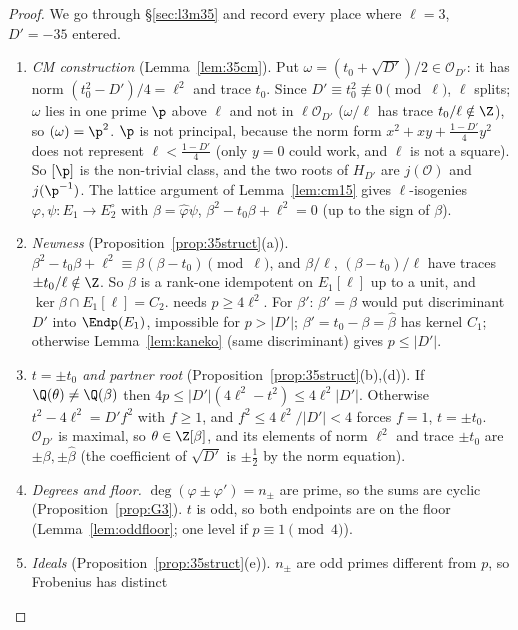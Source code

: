 \begin{proof}
We go through \S\ref{sec:l3m35} and record every place where $\ell=3$, $D'=-35$ entered.
\begin{enumerate}[label=(\roman*)]
\item \emph{CM construction} (Lemma~\ref{lem:35cm}).  Put $\omega=(t_0+\sqrt{D'})/2\in\mathcal O_{D'}$: it has norm
  $(t_0^2-D')/4=\ell^2$ and trace $t_0$.  Since $D'\equiv t_0^2\not\equiv0\pmod\ell$, $\ell$ splits; $\omega$ lies in one
  prime $\p$ above $\ell$ and not in $\ell\mathcal O_{D'}$ ($\omega/\ell$ has trace $t_0/\ell\notin\Z$), so $(\omega)=\p^2$.  $\p$ is
  not principal, because the norm form $x^2+xy+\frac{1-D'}4y^2$ does not represent $\ell<\frac{1-D'}4$ (only $y=0$ could
  work, and $\ell$ is not a square).  So $[\p]$ is the non-trivial class, and the two roots of $H_{D'}$ are $j(\mathcal O)$
  and $j(\p^{-1})$.  The lattice argument of Lemma~\ref{lem:cm15} gives $\ell$-isogenies $\varphi,\psi:E_1\to E_2^\circ$ with
  $\beta=\widehat\varphi\psi$, $\beta^2-t_0\beta+\ell^2=0$ (up to the sign of $\beta$).
\item \emph{Newness} (Proposition~\ref{prop:35struct}(a)).  $\beta^2-t_0\beta+\ell^2\equiv\beta(\beta-t_0)\pmod\ell$, and
  $\beta/\ell$, $(\beta-t_0)/\ell$ have traces $\pm t_0/\ell\notin\Z$.  So $\beta$ is a rank-one idempotent on $E_1[\ell]$ up to
  a unit, and $\ker\beta\cap E_1[\ell]=C_2$.  \cite[Prop.~23]{BS} needs $p\ge4\ell^2$.  For $\beta'$: $\beta'=\beta$ would put
  discriminant $D'$ into $\Endp(E_1)$, impossible for $p>|D'|$; $\beta'=t_0-\beta=\widehat\beta$ has kernel $C_1$; otherwise
  Lemma~\ref{lem:kaneko} (same discriminant) gives $p\le|D'|$.
\item \emph{$t=\pm t_0$ and partner root} (Proposition~\ref{prop:35struct}(b),(d)).  If $\Q(\theta)\neq\Q(\beta)$ then
  $4p\le|D'|(4\ell^2-t^2)\le4\ell^2|D'|$.  Otherwise $t^2-4\ell^2=D'f^2$ with $f\ge1$, and $f^2\le4\ell^2/|D'|<4$ forces $f=1$,
  $t=\pm t_0$.  $\mathcal O_{D'}$ is maximal, so $\theta\in\Z[\beta]$, and its elements of norm $\ell^2$ and trace $\pm t_0$ are
  $\pm\beta,\pm\widehat\beta$ (the coefficient of $\sqrt{D'}$ is $\pm\frac12$ by the norm equation).
\item \emph{Degrees and floor.}  $\deg(\varphi\pm\varphi')=n_\pm$ are prime, so the sums are cyclic
  (Proposition~\ref{prop:G3}).  $t$ is odd, so both endpoints are on the floor (Lemma~\ref{lem:oddfloor}; one level if
  $p\equiv1\pmod4$).
\item \emph{Ideals} (Proposition~\ref{prop:35struct}(e)).  $n_\pm$ are odd primes different from $p$, so Frobenius has distinct

\end{enumerate}
\end{proof}
